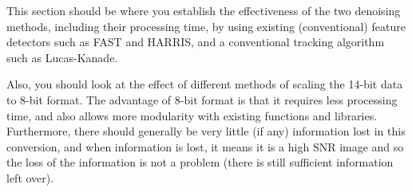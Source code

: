 This section should be where you establish the effectiveness of the two denoising methods, including their processing time, by using existing (conventional) feature detectors such as FAST and HARRIS, and a conventional tracking algorithm such as Lucas-Kanade.

Also, you should look at the effect of different methods of scaling the 14-bit data to 8-bit format. The advantage of 8-bit format is that it requires less processing time, and also allows more modularity with existing functions and libraries. Furthermore, there should generally be very little (if any) information lost in this conversion, and when information is lost, it means it is a high SNR image and so the loss of the information is not a problem (there is still sufficient information left over).